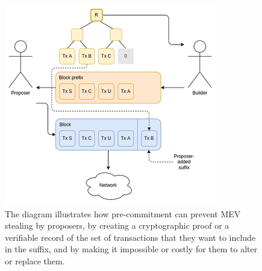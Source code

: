 \documentclass{report}
\begin{document}
  \begin{center}
	\begin{figure}
		\centering
		\includegraphics[width=0.6\linewidth]{Fig/F10}
		\caption{The diagram illustrates how pre-commitment can prevent MEV stealing by proposers, by creating a cryptographic proof or a verifiable record of the set of transactions that they want to include in the suffix, and by making it impossible or costly for them to alter or replace them.}
		\label{fig:f10}
	\end{figure}
\end{center}
\end{document}
